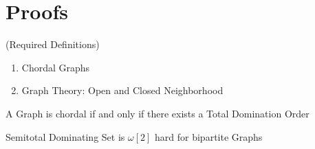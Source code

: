 \chapter{Proofs}
(Required Definitions)\begin{enumerate}
    \item Chordal Graphs
    \item Graph Theory: Open and Closed Neighborhood
\end{enumerate}

\begin{theorem} A Graph is chordal if and only if there exists a Total Domination Order
\end{theorem}


\newpage


\begin{theorem}
    Semitotal Dominating Set is $\omega[2]$ hard for bipartite Graphs
\end{theorem}

